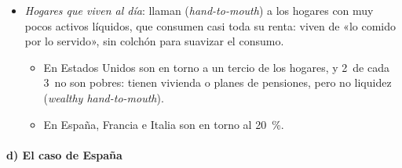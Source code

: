 \documentclass[11pt]{article}
\begin{document}
\begin{itemize}
\begin{itemize}
  \item La respuesta es mayor en los hogares con poca liquidez\nocite{JappelliPistaferri2010Consumption}.
  \end{itemize}
\item \emph{Hogares que viven al día}: \textcite{KaplanViolanteWeidner2014Wealthy} llaman  (\emph{hand-to-mouth}) a los hogares con muy pocos activos líquidos, que consumen casi toda su renta: viven de «lo comido por lo servido», sin colchón para suavizar el consumo.
  \begin{itemize}
  \item En Estados Unidos son en torno a un tercio de los hogares, y 2~de cada 3~no son pobres: tienen vivienda o planes de pensiones, pero no liquidez (\emph{wealthy hand-to-mouth}).
  \item En España, Francia e Italia son en torno al 20~\%.
  \end{itemize}
\end{itemize}

\paragraph{d) El caso de España}
\end{document}
